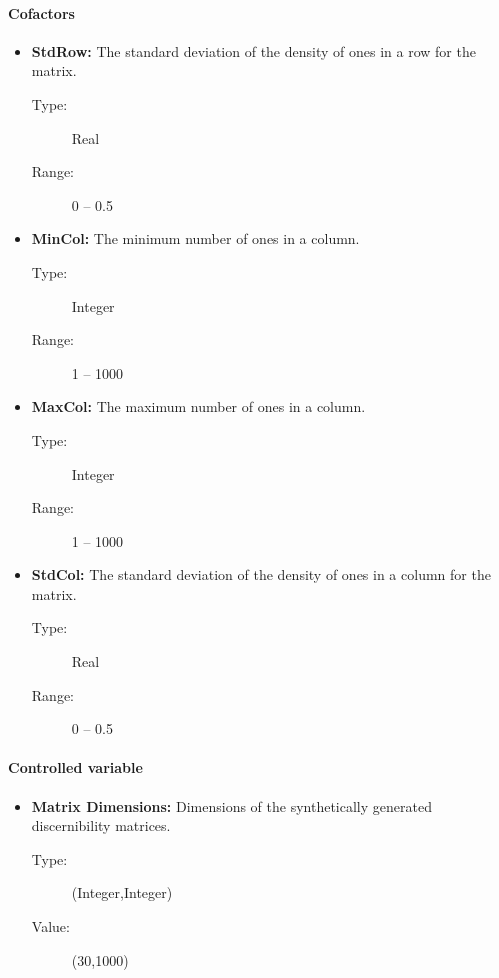 \documentclass[11pt]{article}   %
\begin{document}
    \paragraph{Cofactors}  
  	\begin{itemize}
  	   \item \textbf{StdRow:} The standard deviation of the density of ones in a row for the matrix.
  	   		\begin{description}
  	   			\item[Type:] Real
  	   			\item[Range:] 0 -- 0.5
  	   		\end{description}
  	   \item \textbf{MinCol:} The minimum number of ones in a column.
  	   		\begin{description}
  	   			\item[Type:] Integer
  	   			\item[Range:] 1 -- 1000
  	   		\end{description}
  	   \item \textbf{MaxCol:} The maximum number of ones in a column.
  	   		\begin{description}
  	   			\item[Type:] Integer
  	   			\item[Range:] 1 -- 1000
  	   		\end{description}
  	   \item \textbf{StdCol:} The standard deviation of the density of ones in a column for the matrix.
  	   		\begin{description}
  	   			\item[Type:] Real
  	   			\item[Range:] 0 -- 0.5
  	   		\end{description}
    \end{itemize}
    \paragraph{Controlled variable}  
  	\begin{itemize}
  	   \item \textbf{Matrix Dimensions:} Dimensions of the synthetically generated discernibility matrices.
  	   		\begin{description}
  	   			\item[Type:] (Integer,Integer)
  	   			\item[Value:] (30,1000)
  	   		\end{description}
    \end{itemize}
\end{document}
